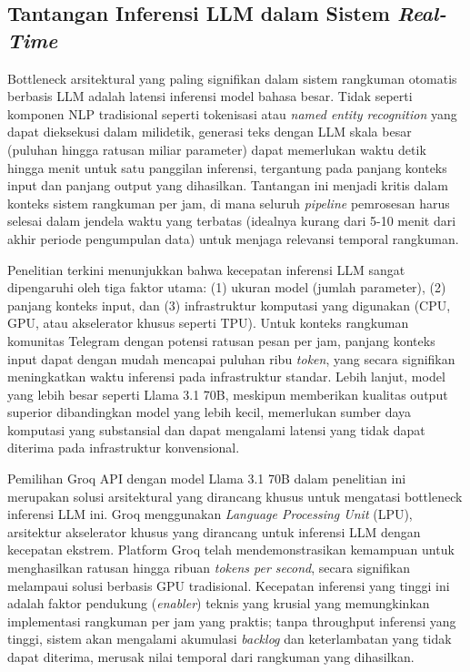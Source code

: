 \subsection{Tantangan Inferensi LLM dalam Sistem \textit{Real-Time}}

Bottleneck arsitektural yang paling signifikan dalam sistem rangkuman otomatis berbasis LLM adalah latensi inferensi model bahasa besar. Tidak seperti komponen NLP tradisional seperti tokenisasi atau \textit{named entity recognition} yang dapat dieksekusi dalam milidetik, generasi teks dengan LLM skala besar (puluhan hingga ratusan miliar parameter) dapat memerlukan waktu detik hingga menit untuk satu panggilan inferensi, tergantung pada panjang konteks input dan panjang output yang dihasilkan. Tantangan ini menjadi kritis dalam konteks sistem rangkuman per jam, di mana seluruh \textit{pipeline} pemrosesan harus selesai dalam jendela waktu yang terbatas (idealnya kurang dari 5-10 menit dari akhir periode pengumpulan data) untuk menjaga relevansi temporal rangkuman.

Penelitian terkini menunjukkan bahwa kecepatan inferensi LLM sangat dipengaruhi oleh tiga faktor utama: (1) ukuran model (jumlah parameter), (2) panjang konteks input, dan (3) infrastruktur komputasi yang digunakan (CPU, GPU, atau akselerator khusus seperti TPU). Untuk konteks rangkuman komunitas Telegram dengan potensi ratusan pesan per jam, panjang konteks input dapat dengan mudah mencapai puluhan ribu \textit{token}, yang secara signifikan meningkatkan waktu inferensi pada infrastruktur standar. Lebih lanjut, model yang lebih besar seperti Llama 3.1 70B, meskipun memberikan kualitas output superior dibandingkan model yang lebih kecil, memerlukan sumber daya komputasi yang substansial dan dapat mengalami latensi yang tidak dapat diterima pada infrastruktur konvensional.

Pemilihan Groq API dengan model Llama 3.1 70B dalam penelitian ini merupakan solusi arsitektural yang dirancang khusus untuk mengatasi bottleneck inferensi LLM ini. Groq menggunakan \textit{Language Processing Unit} (LPU), arsitektur akselerator khusus yang dirancang untuk inferensi LLM dengan kecepatan ekstrem. Platform Groq telah mendemonstrasikan kemampuan untuk menghasilkan ratusan hingga ribuan \textit{tokens per second}, secara signifikan melampaui solusi berbasis GPU tradisional. Kecepatan inferensi yang tinggi ini adalah faktor pendukung (\textit{enabler}) teknis yang krusial yang memungkinkan implementasi rangkuman per jam yang praktis; tanpa throughput inferensi yang tinggi, sistem akan mengalami akumulasi \textit{backlog} dan keterlambatan yang tidak dapat diterima, merusak nilai temporal dari rangkuman yang dihasilkan.

